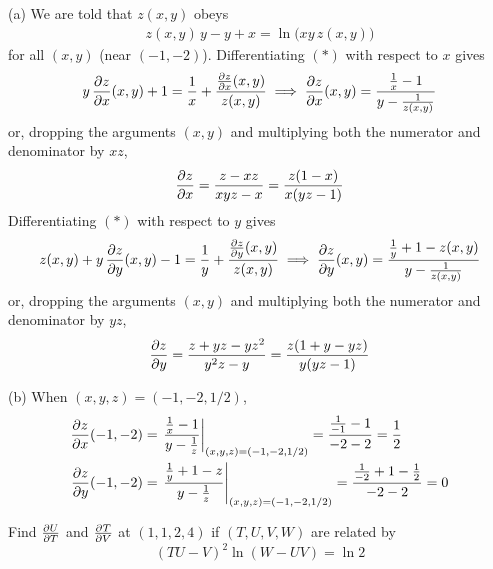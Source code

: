 \begin{solution}
(a) We are told that $z(x,y)$ obeys
\begin{align*}
z(x,y)\, y - y + x = \ln\big(xy\,z(x,y)\big)
\tag{$*$}\end{align*}
for all $(x,y)$ (near $(-1,-2)$).  Differentiating $(*)$ with respect to $x$ 
gives
\begin{align*}
y\,\pdiff{z}{x}(x,y) + 1 = \frac{1}{x} + \frac{\pdiff{z}{x}(x,y)}{z(x,y)}
\implies \pdiff{z}{x}(x,y) = \frac{\frac{1}{x}-1}{y-\frac{1}{z(x,y)}}
\end{align*}
or, dropping the arguments $(x,y)$ and multiplying both the numerator and denominator by $xz$,
\begin{align*}
\pdiff{z}{x} = \frac{z-xz}{xyz-x} = \frac{z(1-x)}{x(yz-1)}
\end{align*}
Differentiating $(*)$ with respect to $y$ 
gives
\begin{align*}
z(x,y)+y\,\pdiff{z}{y}(x,y) - 1 = \frac{1}{y} + \frac{\pdiff{z}{y}(x,y)}{z(x,y)}
\implies \pdiff{z}{y}(x,y) = \frac{\frac{1}{y}+1-z(x,y)}{y-\frac{1}{z(x,y)}}
\end{align*}
or, dropping the arguments $(x,y)$ and multiplying both the numerator and denominator by $yz$,
\begin{align*}
\pdiff{z}{y} = \frac{z+yz-yz^2}{y^2z-y} = \frac{z(1+y-yz)}{y(yz-1)}
\end{align*}

(b)  When $(x,y,z) = (-1, -2, 1/2)$,
\begin{align*}
\pdiff{z}{x}(-1,-2) 
  &= \left.\frac{\frac{1}{x}-1}{y-\frac{1}{z}}
                         \right|_{(x,y,z) = (-1, -2, 1/2)}
   =\frac{\frac{1}{-1}-1}{-2-2}
   =\frac{1}{2} \\
\pdiff{z}{y}(-1,-2)  &= \left.\frac{\frac{1}{y}+1-z}{y-\frac{1}{z}}
                         \right|_{(x,y,z) = (-1, -2, 1/2)}
         =\frac{\frac{1}{-2}+1-\frac{1}{2}}{-2-2}
         =0
\end{align*}
\end{solution}

\begin{question}[M200 2010D] %
Find  $\pdiff{U}{T}$ and $\pdiff{T}{V}$ at $(1, 1, 2, 4)$ if $(T, U, V, W)$ are related by
\begin{equation*}
(TU-V)^2 \ln(W-UV) = \ln 2
\end{equation*}
\end{question}

%

